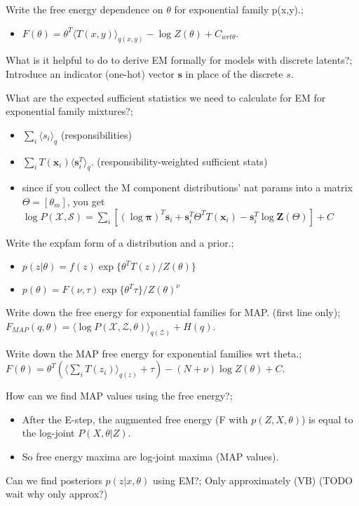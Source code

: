 \documentclass{article}
\begin{document}
Write the free energy dependence on $\theta$ for exponential family p(x,y).; \begin{itemize} \item $F(\theta) = \theta^T\langle T(x, y) \rangle_{q(x, y)} - \log Z(\theta) + C_{wrt \theta}$. \end{itemize}

What is it helpful to do to derive EM formally for models with discrete latents?; Introduce an indicator (one-hot) vector $\mathbf{s}$ in place of the discrete $s$.

What are the expected sufficient statistics we need to calculate for EM for exponential family mixtures?; \begin{itemize} \item $\sum_i \langle s_i \rangle_{q}$ (responsibilities) \item $\sum_i T(\mathbf{x}_i)\langle \mathbf{s}_i^T \rangle_q$. (responsibility-weighted sufficient stats) \item since if you collect the M component distributions' nat params into a matrix $\Theta=[\theta_m]$, you get $\log P(\mathcal{X, S})=\sum_i [(\log \mathbf{\pi})^T\mathbf{s}_i + \mathbf{s}_i^T\Theta^T T(\mathbf{x}_i) - \mathbf{s}_i^T\log \mathbf{Z}(\Theta)]+C$ \end{itemize}


Write the expfam form of a distribution and a prior.; \begin{itemize} \item $p(z|\theta) = f(z)\exp\{\theta^T T(z)/Z(\theta)\}$ \item $p(\theta) = F(\nu, \tau)\exp\{\theta^T\tau\}/Z(\theta)^\nu$ \end{itemize}

Write down the free energy for exponential families for MAP. (first line only);  $F_{MAP}(q,\theta) = \langle \log P(\mathcal{X, Z, \theta})\rangle_{q(\mathcal{Z})}+H(q)$.

Write down the MAP free energy for exponential families wrt theta.;  $F(\theta) = \theta^T(\langle \sum_i T(z_i) \rangle_{q(z)} + \tau)- (N+\nu) \log Z(\theta) + C$.

How can we find MAP values using the free energy?; \begin{itemize} \item After the E-step, the augmented free energy (F with $p(Z, X, \theta)$) is equal to the log-joint $P(X, \theta | Z)$.  \item So free energy maxima are log-joint maxima (MAP values).  \end{itemize}

Can we find posteriors $p(z|x, \theta)$ using EM?; Only approximately (VB) (TODO wait why only approx?)
\end{document}
